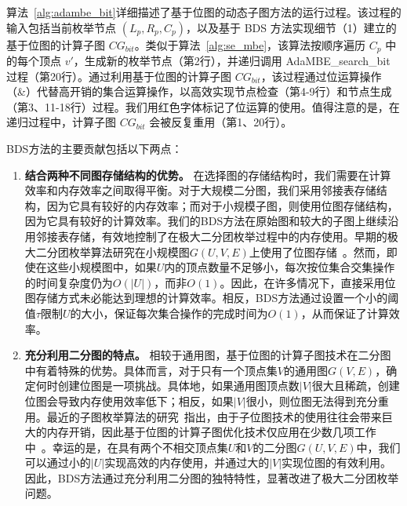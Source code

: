 


算法~\ref{alg:adambe_bit}详细描述了基于位图的动态子图方法的运行过程。该过程的输入包括当前枚举节点 $(L_p, R_p, C_p)$，以及基于 BDS 方法实现细节（1）建立的基于位图的计算子图 $CG_{bit}$。类似于算法~\ref{alg:se_mbe}，该算法按顺序遍历 $C_p$ 中的每个顶点 $v'$，生成新的枚举节点（第2行），并递归调用 \textsf{AdaMBE\_search\_bit} 过程（第20行）。通过利用基于位图的计算子图 $CG_{bit}$，该过程通过位运算操作（\&）代替高开销的集合运算操作，以高效实现节点检查（第4-9行）和节点生成（第3、11-18行）过程。我们用红色字体标记了位运算的使用。值得注意的是，在递归过程中，计算子图 $CG_{bit}$ 会被反复重用（第1、20行）。

  BDS方法的主要贡献包括以下两点：

  \begin{enumerate}
    \item \textbf{结合两种不同图存储结构的优势。} 在选择图的存储结构时，我们需要在计算效率和内存效率之间取得平衡。对于大规模二分图，我们采用邻接表存储结构，因为它具有较好的内存效率；而对于小规模子图，则使用位图存储结构，因为它具有较好的计算效率。我们的BDS方法在原始图和较大的子图上继续沿用邻接表存储，有效地控制了在极大二分团枚举过程中的内存使用。早期的极大二分团枚举算法研究在小规模图$G(U, V, E)$上使用了位图存储~\cite{lcmmbc07,iMBEA14}。然而，即使在这些小规模图中，如果$U$内的顶点数量不足够小，每次按位集合交集操作的时间复杂度仍为$O(|U|)$，而非$O(1)$。因此，在许多情况下，直接采用位图存储方式未必能达到理想的计算效率。相反，BDS方法通过设置一个小的阈值$\tau$限制$U$的大小，保证每次集合操作的完成时间为$O(1)$，从而保证了计算效率。
    
    \item \textbf{充分利用二分图的特点。} 相较于通用图，基于位图的计算子图技术在二分图中有着特殊的优势。具体而言，对于只有一个顶点集$V$的通用图$G(V,E)$，确定何时创建位图是一项挑战。具体地，如果通用图顶点数$|V|$很大且稀疏，创建位图会导致内存使用效率低下；相反，如果$|V|$很小，则位图无法得到充分重用。最近的子图枚举算法的研究~\cite{Graphset23}指出，由于子位图技术的使用往往会带来巨大的内存开销，因此基于位图的计算子图优化技术仅应用在少数几项工作中~\cite{Sandslash21,Kclique22,g2miner22}。幸运的是，在具有两个不相交顶点集$U$和$V$的二分图$G(U,V,E)$中，我们可以通过小的$|U|$实现高效的内存使用，并通过大的$|V|$实现位图的有效利用。因此，BDS方法通过充分利用二分图的独特特性，显著改进了极大二分团枚举问题。
  
\end{enumerate}


